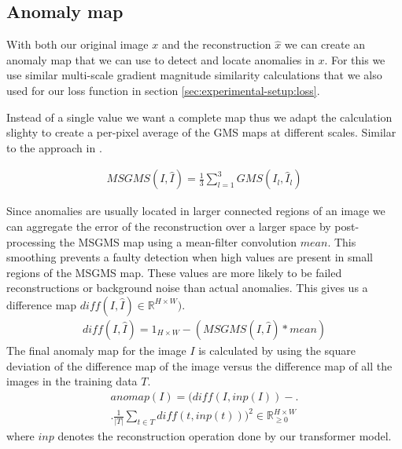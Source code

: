 \subsection{Anomaly map}
\label{subsec:experimental-setup:anomaly-map}

With both our original image $x$ and the reconstruction $\hat{x}$ we can create an anomaly map that we can use to detect and locate anomalies in $x$. For this we use similar multi-scale gradient magnitude similarity calculations that we also used for our loss function in section \ref{sec:experimental-setup:loss}.

Instead of a single value we want a complete map thus we adapt the calculation slighty to create a per-pixel average of the GMS maps at different scales. Similar to the approach in \cite{pirnay_inpainting_2021, zavrtanik_reconstruction_2021}.

\begin{align}
MSGMS(I, \hat{I}) = \frac{1}{3} \sum_{l=1}^{3} {GMS(I_l, \hat{I}_l)}
\label{eq:experimental-setup:msgms}
\end{align}

Since anomalies are usually located in larger connected regions of an image we can aggregate the error of the reconstruction over a larger space by post-processing the MSGMS map using a mean-filter convolution $mean$. This smoothing prevents a faulty detection when high values are present in small regions of the MSGMS map. These values are more likely to be failed reconstructions or background noise than actual anomalies. This gives us a difference map $diff(I, \hat{I}) \in \mathbb{R}^{H \times W})$.
%
\begin{align}
diff(I, \hat{I}) = 1_{H \times W} - (MSGMS(I, \hat{I}) \ast mean)
\label{eq:experimental-setup:diff}
\end{align}
%
The final anomaly map for the image $I$ is calculated by using the square deviation of the difference map of the image versus the difference map of all the images in the training data $T$.
%
\begin{equation}
\begin{aligned}
anomap(I) = \biggl( {diff}(I, inp(I)) - \bigr. \\
\biggl. \frac{1}{|T|} \sum_{t \in T}{{diff}(t, inp(t))} \Bigr) ^ 2 \in \mathbb{R}_{\geq 0}^{H \times W}
\label{eq:experimental-setup:anomap}
\end{aligned}
\end{equation}
%
where $inp$ denotes the reconstruction operation done by our transformer model.

